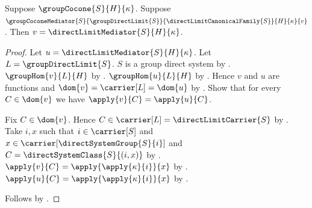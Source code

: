 \begin{theorem}\label{direct_limit_mediator_unique}
    Suppose $\groupCocone{S}{H}{\kappa}$.
    Suppose $\groupCoconeMediator
        {S}{\groupDirectLimit{S}}{\directLimitCanonicalFamily{S}}
        {H}{\kappa}{v}$.
    Then $v=\directLimitMediator{S}{H}{\kappa}$.
\end{theorem}
\begin{proof}
    Let $u=\directLimitMediator{S}{H}{\kappa}$.
    Let $L=\groupDirectLimit{S}$.
    $S$ is a group direct system by
        .
    $\groupHom{v}{L}{H}$ by
        .
    $\groupHom{u}{L}{H}$ by
        .
    Hence $v$ and $u$ are functions and
        $\dom{v}=\carrier[L]=\dom{u}$ by
        .
    Show that for every $C\in\dom{v}$ we have
        $\apply{v}{C}=\apply{u}{C}$.
    \begin{subproof}
        Fix $C\in\dom{v}$.
        Hence $C\in\carrier[L]=\directLimitCarrier{S}$ by
            .
        Take $i,x$ such that $i\in\carrier[S]$ and
            $x\in\carrier[\directSystemGroup{S}{i}]$ and
            $C=\directSystemClass{S}{(i,x)}$ by
            .
        $\apply{v}{C}=\apply{\apply{\kappa}{i}}{x}$ by
            .
        $\apply{u}{C}=\apply{\apply{\kappa}{i}}{x}$ by
            .
    \end{subproof}
    Follows by .
\end{proof}

